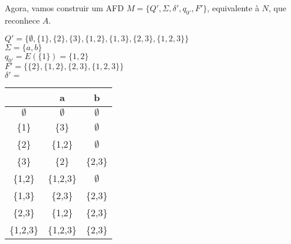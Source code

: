 Agora, vamos construir um AFD $M = \{Q', \Sigma, \delta', q_{0'}, F'\}$, equivalente à $N$, que reconhece $A$.

\noindent$Q' = \{\emptyset, \{1\}, \{2\}, \{3\}, \{1,2\}, \{1,3\}, \{2,3\}, \{1,2,3\} \}$\\
$\Sigma = \{a, b\}$\\
$q_{0'} = E(\{1\}) = \{1,2\}$\\
$F' = \{\{2\}, \{1,2\}, \{2,3\}, \{1,2,3\} \}$\\
$\delta' = $
\begin{table}[!h]
\centering
{}
\begin{tabular}{c|c|c}
                & a             & b             \\ \hline
$\emptyset$     & $\emptyset$   & $\emptyset$   \\
\{1\}           & \{3\}         & $\emptyset$     \\
\{2\}           & \{1,2\}       & $\emptyset$     \\
\{3\}           & \{2\}         & \{2,3\}       \\
\{1,2\}         & \{1,2,3\}     & $\emptyset$     \\
\{1,3\}         & \{2,3\}       & \{2,3\}       \\
\{2,3\}         & \{1,2\}       & \{2,3\}       \\
\{1,2,3\}       & \{1,2,3\}     & \{2,3\}
\end{tabular}
\end{table}

